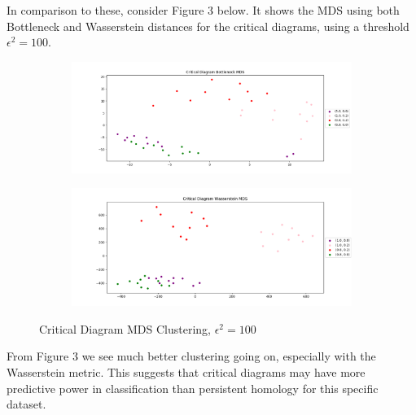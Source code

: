 \documentclass[12pt, fullpage,letterpaper]{article}
\theoremstyle{definition}
\begin{document}
	In comparison to these, consider Figure 3 below. It shows the MDS using both Bottleneck and Wasserstein distances for the critical diagrams, using a threshold $\epsilon^2 = 100$.
	\begin{figure}[ht!]
		\centering
		\begin{subfigure}
			\centering
			\includegraphics[scale = .5]{mdscritbott.png}
		\end{subfigure}
		\begin{subfigure}
			\centering
			\includegraphics[scale = .5]{mdscritwasser.png}
		\end{subfigure}
		\caption{Critical Diagram MDS Clustering, $\epsilon^2 = 100$}
	\end{figure}
	From Figure 3 we see much better clustering going on, especially with the Wasserstein metric. This suggests that critical diagrams may have more predictive power in classification than persistent homology for this specific dataset.
	
\end{document}
